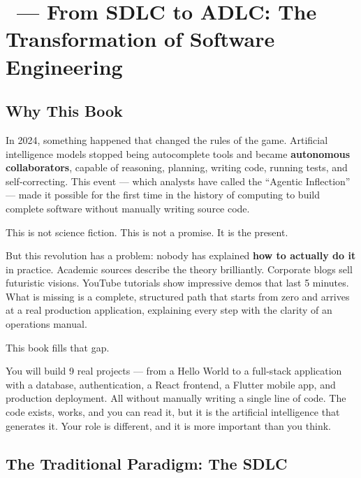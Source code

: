 \chapter*{\LabelIntroduction\ --- From SDLC to ADLC: The Transformation of Software Engineering}
\markboth{\LabelIntroduction}{\LabelIntroduction}

\section*{Why This Book}

In 2024, something happened that changed the rules of the game. Artificial intelligence models stopped being autocomplete tools and became \textbf{autonomous collaborators}, capable of reasoning, planning, writing code, running tests, and self-correcting. This event --- which analysts have called the ``Agentic Inflection'' --- made it possible for the first time in the history of computing to build complete software without manually writing source code.

This is not science fiction. This is not a promise. It is the present.

But this revolution has a problem: nobody has explained \textbf{how to actually do it} in practice. Academic sources describe the theory brilliantly. Corporate blogs sell futuristic visions. YouTube tutorials show impressive demos that last 5 minutes. What is missing is a complete, structured path that starts from zero and arrives at a real production application, explaining every step with the clarity of an operations manual.

This book fills that gap.

You will build 9 real projects --- from a Hello World to a full-stack application with a database, authentication, a React frontend, a Flutter mobile app, and production deployment. All without manually writing a single line of code. The code exists, works, and you can read it, but it is the artificial intelligence that generates it. Your role is different, and it is more important than you think.

\section*{The Traditional Paradigm: The SDLC}

